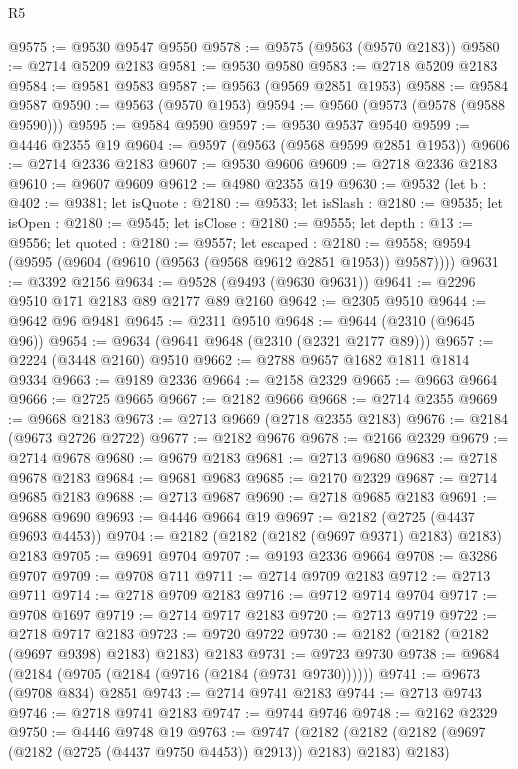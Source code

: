 \begin{lexlean}{R5}
\begin{coremodule}
@9575 := @9530 @9547 @9550
@9578 := @9575 (@9563 (@9570 @2183))
@9580 := @2714 @5209 @2183
@9581 := @9530 @9580
@9583 := @2718 @5209 @2183
@9584 := @9581 @9583
@9587 := @9563 (@9569 @2851 @1953)
@9588 := @9584 @9587
@9590 := @9563 (@9570 @1953)
@9594 := @9560 (@9573 (@9578 (@9588 @9590)))
@9595 := @9584 @9590
@9597 := @9530 @9537 @9540
@9599 := @4446 @2355 @19
@9604 := @9597 (@9563 (@9568 @9599 @2851 @1953))
@9606 := @2714 @2336 @2183
@9607 := @9530 @9606
@9609 := @2718 @2336 @2183
@9610 := @9607 @9609
@9612 := @4980 @2355 @19
@9630 := @9532
    (let b : @402 := @9381;
    let isQuote : @2180 := @9533;
    let isSlash : @2180 := @9535;
    let isOpen : @2180 := @9545;
    let isClose : @2180 := @9555;
    let depth : @13 := @9556;
    let quoted : @2180 := @9557;
    let escaped : @2180 := @9558;
    @9594 (@9595 (@9604 (@9610 (@9563 (@9568 @9612 @2851 @1953)) @9587))))
@9631 := @3392 @2156
@9634 := @9528 (@9493 (@9630 @9631))
@9641 := @2296 @9510 @171 @2183 @89 @2177 @89 @2160
@9642 := @2305 @9510
@9644 := @9642 @96 @9481
@9645 := @2311 @9510
@9648 := @9644 (@2310 (@9645 @96))
@9654 := @9634 (@9641 @9648 (@2310 (@2321 @2177 @89)))
@9657 := @2224 (@3448 @2160) @9510
@9662 := @2788 @9657 @1682 @1811 @1814 @9334
@9663 := @9189 @2336
@9664 := @2158 @2329
@9665 := @9663 @9664
@9666 := @2725 @9665
@9667 := @2182 @9666
@9668 := @2714 @2355
@9669 := @9668 @2183
@9673 := @2713 @9669 (@2718 @2355 @2183)
@9676 := @2184 (@9673 @2726 @2722)
@9677 := @2182 @9676
@9678 := @2166 @2329
@9679 := @2714 @9678
@9680 := @9679 @2183
@9681 := @2713 @9680
@9683 := @2718 @9678 @2183
@9684 := @9681 @9683
@9685 := @2170 @2329
@9687 := @2714 @9685 @2183
@9688 := @2713 @9687
@9690 := @2718 @9685 @2183
@9691 := @9688 @9690
@9693 := @4446 @9664 @19
@9697 := @2182 (@2725 (@4437 @9693 @4453))
@9704 := @2182 (@2182 (@2182 (@9697 @9371) @2183) @2183) @2183
@9705 := @9691 @9704
@9707 := @9193 @2336 @9664
@9708 := @3286 @9707
@9709 := @9708 @711
@9711 := @2714 @9709 @2183
@9712 := @2713 @9711
@9714 := @2718 @9709 @2183
@9716 := @9712 @9714 @9704
@9717 := @9708 @1697
@9719 := @2714 @9717 @2183
@9720 := @2713 @9719
@9722 := @2718 @9717 @2183
@9723 := @9720 @9722
@9730 := @2182 (@2182 (@2182 (@9697 @9398) @2183) @2183) @2183
@9731 := @9723 @9730
@9738 := @9684 (@2184 (@9705 (@2184 (@9716 (@2184 (@9731 @9730))))))
@9741 := @9673 (@9708 @834) @2851
@9743 := @2714 @9741 @2183
@9744 := @2713 @9743
@9746 := @2718 @9741 @2183
@9747 := @9744 @9746
@9748 := @2162 @2329
@9750 := @4446 @9748 @19
@9763 := @9747
    (@2182 (@2182 (@2182 (@9697 (@2182 (@2725 (@4437 @9750 @4453)) @2913)) @2183) @2183) @2183)

\end{coremodule}
\end{lexlean}
